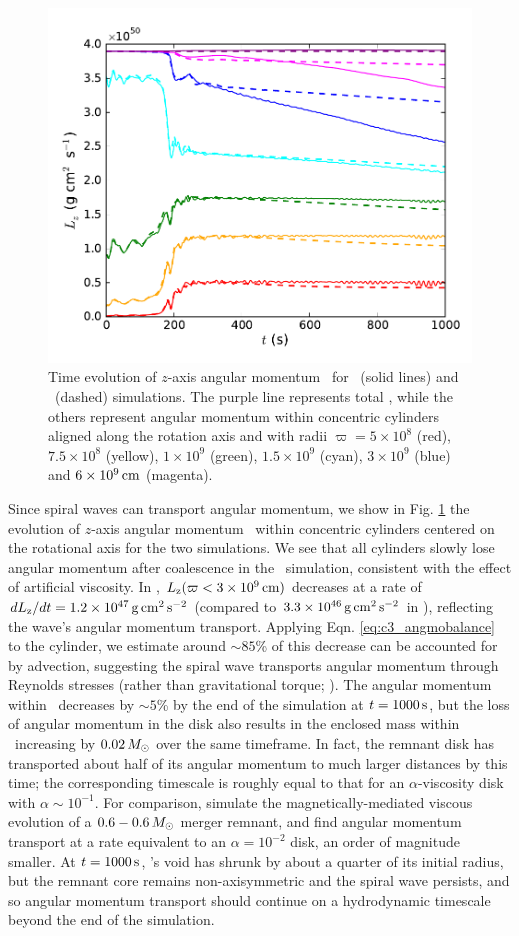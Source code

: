 \begin{figure}
\centering
\includegraphics[angle=0,width=0.6\columnwidth]{chapter3_zhu+u/figures/Lz.pdf}
\caption{Time evolution of $z$-axis angular momentum \Lz\ for \arepo\ (solid lines) and \gasoline\ (dashed) simulations.  The purple line represents total \Lz, while the others represent angular momentum within concentric cylinders aligned along the rotation axis and with radii $\varpi = 5\times10^8$ (red), $7.5\times10^8$ (yellow), $1\times10^9$ (green), $1.5\times10^9$ (cyan), $3\times10^9$ (blue) and $6\times10^9\,\mathrm{cm}$ (magenta).}
\label{fig:c3_angmo}
\end{figure}

Since spiral waves can transport angular momentum, we show in Fig. \ref{fig:c3_angmo} the evolution of $z$-axis angular momentum \Lz\ within concentric cylinders centered on the rotational axis for the two simulations.  We see that all cylinders slowly lose angular momentum after coalescence in the \gasoline\ simulation, consistent with the effect of artificial viscosity.  In \arepo, $\Lz(\varpi < 3\times10^9\,\mrm{cm})$ decreases at a rate of $d\Lz/dt = 1.2\times10^{47}\,\mrm{g}\,\mrm{cm}^2\,\mrm{s}^{-2}$ (compared to $3.3\times10^{46}\,\mathrm{g}\,\mathrm{cm}^2\,\mathrm{s}^{-2}$ in \gasoline), reflecting the wave's angular momentum transport.  Applying Eqn. \ref{eq:c3_angmobalance} to the cylinder, we estimate around $\sim85$\% of this decrease can be accounted for by advection, suggesting the spiral wave transports angular momentum through Reynolds stresses (rather than gravitational torque; \citealt{kratl16}).  The angular momentum within \innercyl\ decreases by $\sim5$\% by the end of the simulation at $t = 1000\,\mathrm{s}$, but the loss of angular momentum in the disk also results in the enclosed mass within \innercyl\ increasing by $0.02\,\Msun$ over the same timeframe.  In fact, the remnant disk has transported about half of its angular momentum to much larger distances by this time; the corresponding timescale is roughly equal to that for an $\alpha$-viscosity disk with $\alpha \sim 10^{-1}$.  For comparison, \cite{ji+13} simulate the magnetically-mediated viscous evolution of a $0.6-0.6\,\Msun$ merger remnant, and find angular momentum transport at a rate equivalent to an $\alpha = 10^{-2}$ disk, an order of magnitude smaller.  At $t = 1000\,\mathrm{s}$, \arepo's void has shrunk by about a quarter of its initial radius, but the remnant core remains non-axisymmetric and the spiral wave persists, and so angular momentum transport should continue on a hydrodynamic timescale beyond the end of the simulation.

